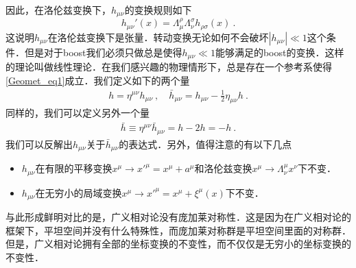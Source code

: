 因此，在洛伦兹变换下，$h_{\mu\nu}$的变换规则如下
\begin{equation}
h_{\mu\nu}'(x) = \Lambda^\rho_\mu\Lambda^\sigma_\nu h_{\rho\sigma} (x) ~. 
\end{equation}
这说明$h_{\mu\nu}$在洛伦兹变换下是张量．转动变换无论如何不会破坏$|h_{\mu\nu}|\ll 1$这个条件．但是对于boost我们必须只做总是使得$h_{\mu\nu}\ll 1$能够满足的boost的变换．这样的理论叫做线性理论．在我们感兴趣的物理情形下，总是存在一个参考系使得\autoref{Geomet_eq1}成立．我们定义如下的两个量 
\begin{align}
h = \eta^{\mu\nu} h_{\mu\nu} ~, \quad \bar h_{\mu\nu} = h_{\mu\nu} - \frac{1}{2} \eta_{\mu\nu} h~.
\end{align}
同样的，我们可以定义另外一个量
\begin{align}
\bar h \equiv \eta^{\mu\nu} \bar h_{\mu\nu} = h - 2 h = -h~.
\end{align}
我们可以反解出$h_{\mu\nu}$关于$\bar h_{\mu\nu}$的表达式．另外，值得注意的有以下几点
\begin{itemize}
\item $h_{\mu\nu}$在有限的平移变换$x^\mu\rightarrow x'^\mu = x^\mu + a^\mu$和洛伦兹变换$x^\mu\rightarrow \Lambda^\mu_\nu x^\nu$下不变．
\item $h_{\mu\nu}$在无穷小的局域变换$x^\mu \rightarrow x'^\mu = x^\mu + \xi^\mu (x)$下不变．
\end{itemize}
与此形成鲜明对比的是，广义相对论没有庞加莱对称性．这是因为在广义相对论的框架下，平坦空间并没有什么特殊性，而庞加莱对称群是平坦空间里面的对称群．但是，广义相对论拥有全部的坐标变换的不变性，而不仅仅是无穷小的坐标变换的不变性．







